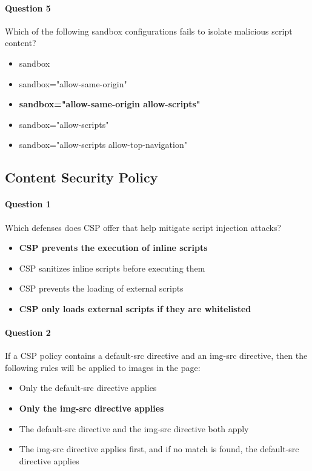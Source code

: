 \documentclass[titlepage]{article}
\begin{document}
    \paragraph{Question 5} Which of the following sandbox configurations fails to isolate malicious script content?
    \begin{itemize}
        \item sandbox
        \item sandbox="allow-same-origin"
        \item \textbf{sandbox="allow-same-origin allow-scripts"} \checkmark
        \item sandbox="allow-scripts"
        \item sandbox="allow-scripts allow-top-navigation"
    \end{itemize}
    \subsection{Content Security Policy}
    \paragraph{Question 1} Which defenses does CSP offer that help mitigate script injection attacks?
    \begin{itemize}
        \item \textbf{CSP prevents the execution of inline scripts} \checkmark
        \item CSP sanitizes inline scripts before executing them
        \item CSP prevents the loading of external scripts
        \item \textbf{CSP only loads external scripts if they are whitelisted} \checkmark
    \end{itemize}
    \paragraph{Question 2} If a CSP policy contains a default-src directive and an img-src directive, then the following rules will be applied to images in the page:
    \begin{itemize}
        \item Only the default-src directive applies
        \item \textbf{Only the img-src directive applies} \checkmark
        \item The default-src directive and the img-src directive both apply
        \item The img-src directive applies first, and if no match is found, the default-src directive applies
    \end{itemize}
\end{document}

